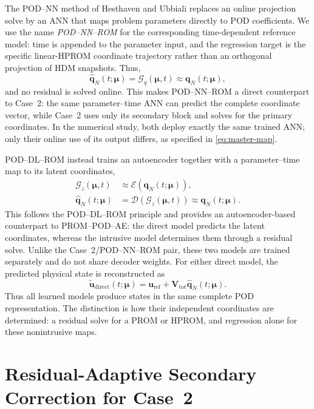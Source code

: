 \documentclass[11pt]{article}
\newcommand{\q}{\mathbf q}
\newcommand{\uvec}{\mathbf u}
\newcommand{\utilde}{\widetilde{\mathbf u}}
\newcommand{\mub}{\bm\mu}
\begin{document}
The POD--NN method of Hesthaven and Ubbiali
\cite{hesthaven2018non} replaces an online projection solve by an ANN that
maps problem parameters directly to POD coefficients.  We use the name
\emph{POD--NN--ROM} for the corresponding time-dependent reference model:
time is appended to the parameter input, and the regression target is the
specific linear-HPROM coordinate trajectory rather than an orthogonal
projection of HDM snapshots.  Thus,
\begin{equation}
\widehat{\q}_N(t;\mub)=\mathcal G_q(\mub,t)\approx\q_N(t;\mub),
\label{eq:podnn}
\end{equation}
and no residual is solved online.  This makes POD--NN--ROM a direct
counterpart to Case~2: the same parameter--time ANN can predict the
complete coordinate vector, while Case~2 uses only its secondary block
and solves for the primary coordinates.  In the numerical study, both
deploy exactly the same trained ANN; only their online use of its output
differs, as specified in \eqref{eq:master-map}.

POD--DL--ROM instead trains an
autoencoder together with a parameter--time map to its latent coordinates,
\begin{equation}
\begin{aligned}
\mathcal G_z(\mub,t)&\approx\mathcal E(\q_N(t;\mub)),\\
\widehat{\q}_N(t;\mub)&=\mathcal D(\mathcal G_z(\mub,t))
\approx\q_N(t;\mub).
\end{aligned}
\label{eq:poddl}
\end{equation}
This follows the POD--DL--ROM principle \cite{fresca2022pod} and provides
an autoencoder-based counterpart to PROM--POD--AE: the direct model
predicts the latent coordinates, whereas the intrusive model determines
them through a residual solve.  Unlike the Case~2/POD--NN--ROM pair, these
two models are trained separately and do not share decoder weights.
For either direct model, the predicted physical state is reconstructed as
\begin{equation}
\utilde_{\mathrm{direct}}(t;\mub)
=\uvec_{\mathrm{ref}}+\mathbf V_{\mathrm{tot}}\widehat{\q}_N(t;\mub).
\label{eq:direct-state-reconstruction}
\end{equation}
Thus all learned models produce states in the same complete POD
representation.  The distinction is how their independent coordinates are
determined: a residual solve for a PROM or HPROM, and regression alone for
these nonintrusive maps.

\section{Residual-Adaptive Secondary Correction for Case~2}
\label{sec:adaptive-case2}
\end{document}
